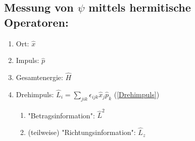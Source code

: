 \subsection{Messung von $\psi$ mittels hermitische Operatoren:} \label{Operatoren}
\begin{enumerate}
    \item Ort: $\hat{x}$
    \item Impuls: $\hat{p}$
    \item Gesamtenergie: $\hat{H}$
    \item Drehimpuls: $\hat{L}_i=\sum_{jik}\epsilon_{ijk}\hat{x}_j\hat{p}_k$ (\ref{Drehimpuls})
    \begin{enumerate}
        \item "Betragsinformation": $\hat{L}^2$
        \item (teilweise) "Richtungsinformation": $\hat{L}_z$
    \end{enumerate}

\end{enumerate}
\newpage

